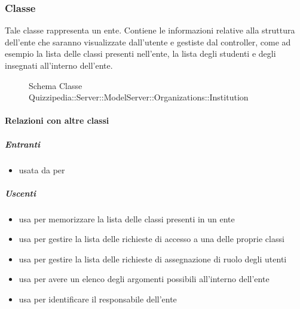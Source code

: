 \subsubsection{Classe }
Tale classe rappresenta un ente. Contiene le informazioni relative alla struttura dell'ente che saranno visualizzate dall'utente e gestiste dal controller, come ad esempio la lista delle classi presenti nell'ente, la lista degli studenti e degli insegnati all'interno dell'ente.
\begin{figure}[H]
\centering
\noindent{}
\caption[Schema Classe Institution]{Schema Classe Quizzipedia::Server::ModelServer::Organizations::Institution}
\end{figure}
\paragraph{Relazioni con altre classi}
\subparagraph{Entranti}
\begin{itemize}
\item usata da  per 
\end{itemize}
\subparagraph{Uscenti}
\begin{itemize}
\item usa  per memorizzare la lista
delle classi presenti in un ente
\item usa  per gestire la lista delle richieste di accesso a una delle proprie classi
\item usa  per gestire la lista delle richieste di assegnazione di ruolo degli utenti
\item usa  per avere un elenco degli argomenti possibili all'interno dell'ente
\item usa  per identificare il responsabile dell'ente
\end{itemize}

